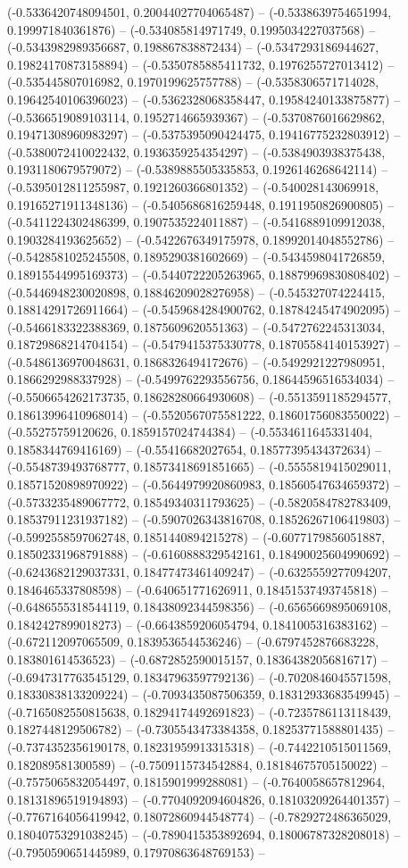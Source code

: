 (-0.5336420748094501, 0.20044027704065487) -- (-0.5338639754651994, 0.199971840361876) -- (-0.534085814971749, 0.1995034227037568) -- (-0.5343982989356687, 0.198867838872434) -- (-0.5347293186944627, 0.19824170873158894) -- (-0.5350785885411732, 0.1976255727013412) -- (-0.535445807016982, 0.1970199625757788) -- (-0.5358306571714028, 0.19642540106396023) -- (-0.5362328068358447, 0.19584240133875877) -- (-0.5366519089103114, 0.1952714665939367) -- (-0.5370876016629862, 0.19471308960983297) -- (-0.5375395090424475, 0.19416775232803912) -- (-0.5380072410022432, 0.1936359254354297) -- (-0.5384903938375438, 0.1931180679579072) -- (-0.5389885505335853, 0.1926146268642114) -- (-0.5395012811255987, 0.1921260366801352) -- (-0.540028143069918, 0.19165271911348136) -- (-0.5405686816259448, 0.1911950826900805) -- (-0.5411224302486399, 0.1907535224011887) -- (-0.5416889109912038, 0.1903284193625652) -- (-0.5422676349175978, 0.18992014048552786) -- (-0.5428581025245508, 0.1895290381602669) -- (-0.5434598041726859, 0.18915544995169373) -- (-0.5440722205263965, 0.18879969830808402) -- (-0.5446948230020898, 0.18846209028276958) -- (-0.545327074224415, 0.18814291726911664) -- (-0.5459684284900762, 0.18784245474902095) -- (-0.5466183322388369, 0.1875609620551363) -- (-0.5472762245313034, 0.18729868214704154) -- (-0.5479415375330778, 0.18705584140153927) -- (-0.5486136970048631, 0.1868326494172676) -- (-0.5492921227980951, 0.1866292988337928) -- (-0.5499762293556756, 0.18644596516534034) -- (-0.5506654262173735, 0.18628280664930608) -- (-0.5513591185294577, 0.18613996410968014) -- (-0.5520567075581222, 0.18601756083550022) -- (-0.55275759120626, 0.1859157024744384) -- (-0.5534611645331404, 0.1858344769416169) -- (-0.55416682027654, 0.18577395434372634) -- (-0.5548739493768777, 0.18573418691851665) -- (-0.5555819415029011, 0.18571520898970922) -- (-0.5644979920860983, 0.18560547634659372) -- (-0.5733235489067772, 0.18549340311793625) -- (-0.5820584782783409, 0.18537911231937182) -- (-0.5907026343816708, 0.18526267106419803) -- (-0.5992558597062748, 0.1851440894215278) -- (-0.6077179856051887, 0.18502331968791888) -- (-0.6160888329542161, 0.18490025604990692) -- (-0.6243682129037331, 0.18477473461409247) -- (-0.6325559277094207, 0.1846465337808598) -- (-0.640651771626911, 0.18451537493745818) -- (-0.6486555318544119, 0.18438092344598356) -- (-0.6565669895069108, 0.1842427899018273) -- (-0.6643859206054794, 0.1841005316383162) -- (-0.672112097065509, 0.1839536544536246) -- (-0.6797452876683228, 0.183801614536523) -- (-0.6872852590015157, 0.18364382056816717) -- (-0.6947317763545129, 0.18347963597792136) -- (-0.7020846045571598, 0.18330838133209224) -- (-0.7093435087506359, 0.18312933683549945) -- (-0.7165082550815638, 0.18294174492691823) -- (-0.7235786113118439, 0.1827448129506782) -- (-0.7305543473384358, 0.18253771588801435) -- (-0.7374352356190178, 0.18231959913315318) -- (-0.7442210515011569, 0.182089581300589) -- (-0.7509115734542884, 0.18184675705150022) -- (-0.7575065832054497, 0.1815901999288081) -- (-0.7640058657812964, 0.18131896519194893) -- (-0.7704092094604826, 0.18103209264401357) -- (-0.7767164056419942, 0.18072860944548774) -- (-0.7829272486365029, 0.18040753291038245) -- (-0.7890415353892694, 0.18006787328208018) -- (-0.7950590651445989, 0.17970863648769153) -- 